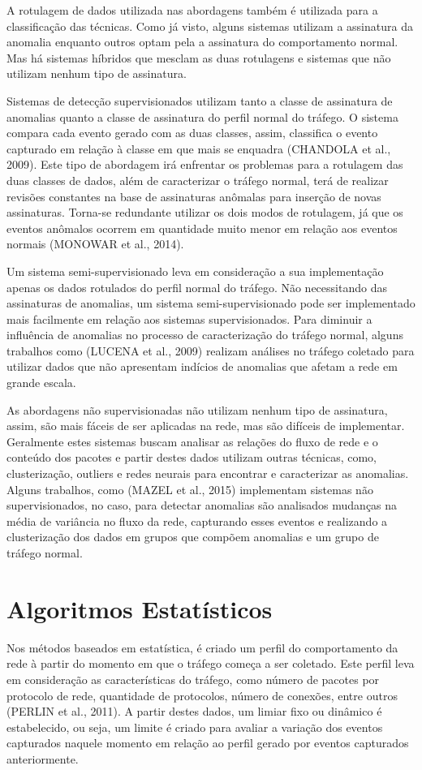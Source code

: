 \documentclass[12pt,openright,oneside,a4paper,english,spanish,brazil]{unifil}
\begin{document}
\indent A rotulagem de dados utilizada nas abordagens também é utilizada para a classificação das técnicas. Como já visto, alguns sistemas utilizam a assinatura da anomalia enquanto outros optam pela a assinatura do comportamento normal. Mas há sistemas híbridos que mesclam as duas rotulagens e sistemas que não utilizam nenhum tipo de assinatura.

\indent Sistemas de detecção supervisionados utilizam tanto a classe de assinatura de anomalias quanto a classe de assinatura do perfil normal do tráfego. O sistema compara cada evento gerado com as duas classes, assim, classifica o evento capturado em relação à classe em que mais se enquadra (CHANDOLA et al., 2009). Este tipo de abordagem irá enfrentar os problemas para a rotulagem das duas classes de dados, além de caracterizar o tráfego normal, terá de realizar revisões constantes na base de assinaturas anômalas para inserção de novas assinaturas. Torna-se redundante utilizar os dois modos de rotulagem, já que os eventos anômalos ocorrem em quantidade muito menor em relação aos eventos normais (MONOWAR et al., 2014). 
 
\indent Um sistema semi-supervisionado leva em consideração a sua implementação apenas os dados rotulados do perfil normal do tráfego. Não necessitando das assinaturas de anomalias, um sistema semi-supervisionado pode ser implementado mais facilmente em relação aos sistemas supervisionados. Para diminuir a influência de anomalias no processo de caracterização do tráfego normal, alguns trabalhos como (LUCENA et al., 2009) realizam análises no tráfego coletado para utilizar dados que não apresentam indícios de anomalias que afetam a rede em grande escala.    
    
\indent As abordagens não supervisionadas não utilizam nenhum tipo de assinatura, assim, são mais fáceis de ser aplicadas na rede, mas são difíceis de implementar. Geralmente estes sistemas buscam analisar as relações do fluxo de rede e o conteúdo dos pacotes e partir destes dados utilizam outras técnicas, como, clusterização, outliers e redes neurais para encontrar e caracterizar as anomalias. Alguns trabalhos, como (MAZEL et al., 2015) implementam sistemas não supervisionados, no caso, para detectar anomalias são analisados mudanças na média de variância no fluxo da rede, capturando esses eventos e realizando a clusterização dos dados em grupos que compõem anomalias e um grupo de tráfego normal.
    
  
  \section{Algoritmos Estatísticos}
\indent Nos métodos baseados em estatística, é criado um perfil do comportamento da rede à partir do momento em que o tráfego começa a ser coletado. Este perfil leva em consideração as características do tráfego, como número de pacotes por protocolo de rede, quantidade de protocolos, número de conexões, entre outros (PERLIN et al., 2011). A partir destes dados, um limiar fixo ou dinâmico é estabelecido, ou seja, um limite é criado para avaliar a variação dos eventos capturados naquele momento em relação ao perfil gerado por eventos capturados anteriormente.
\end{document}
